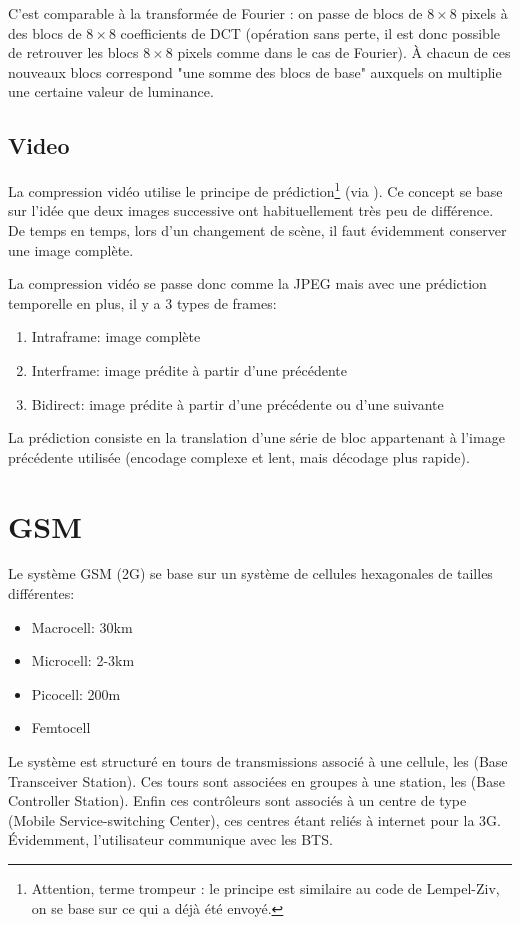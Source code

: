 C'est comparable à la transformée de Fourier : on passe de blocs de $8 \times 8$ pixels à des blocs de $8 \times 8$ coefficients de DCT (opération sans perte, il est donc possible de retrouver les blocs $8 \times 8$ pixels comme dans le cas de Fourier). À chacun de ces nouveaux blocs correspond "une somme des blocs de base" auxquels on multiplie une certaine valeur de luminance.

\section{Video}

La compression vidéo utilise le principe de prédiction\footnote{Attention, terme trompeur : le principe est similaire au code de Lempel-Ziv, on se base sur ce qui a déjà été envoyé.} (via ).
Ce concept se base sur l'idée que deux images successive ont habituellement très peu de différence. De temps en temps, lors d'un changement de scène, il faut évidemment conserver une image complète.

La compression vidéo se passe donc comme la JPEG mais avec une prédiction temporelle en plus, il y a 3 types de frames:
\begin{enumerate}
\item Intraframe: image complète
\item Interframe: image prédite à partir d'une précédente
\item Bidirect: image prédite à partir d'une précédente ou d'une suivante
\end{enumerate}
La prédiction consiste en la translation d'une série de bloc appartenant à l'image précédente utilisée (encodage complexe et lent, mais décodage plus rapide).

\chapter{GSM}

Le système GSM (2G) se base sur un système de cellules hexagonales de tailles différentes:
\begin{itemize}
	\item Macrocell: 30km
	\item Microcell: 2-3km
	\item Picocell: 200m
	\item Femtocell
\end{itemize}

Le système est structuré en tours de transmissions associé à une cellule, les  (Base Transceiver Station). Ces tours sont associées en groupes à une station, les  (Base Controller Station). Enfin ces contrôleurs sont associés à un centre de type  (Mobile Service-switching Center), ces centres étant reliés à internet pour la 3G. Évidemment, l'utilisateur communique avec les BTS.

